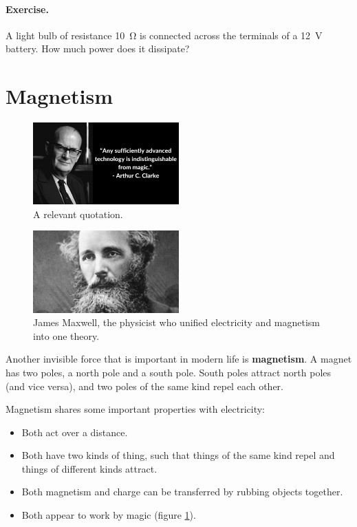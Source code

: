 \documentclass[a4paper]{amsbook}
\newcommand\capcite[1]{}
\begin{document}
\paragraph{Exercise.} A light bulb of resistance \SI{10}{\ohm} is connected across the terminals of a \SI{12}{\volt} battery.
How much power does it dissipate?

\section{Magnetism}
\begin{figure}
  \centering
  \includegraphics[width=0.5\textwidth]{clarke}
  \caption{A relevant quotation. \capcite{http://ludwigiplaw.com/wp-content/uploads/2016/09/arthur_clarke.png}\label{fig:clarke}}
\end{figure}
\begin{figure}
  \centering
  \includegraphics[width=0.5\textwidth]{maxwell}
  \caption{James Maxwell, the physicist who unified electricity and magnetism into one theory. \capcite{https://ichef.bbci.co.uk/images/ic/1920x1080/p039px8r.jpg}\label{fig:maxwell}}
\end{figure}
Another invisible force that is important in modern life is \textbf{magnetism}. A magnet has two poles, a north pole and a
south pole. South poles attract north poles (and vice versa), and two poles of the same kind repel each other.

Magnetism shares some important properties with electricity:
\begin{itemize}
  \item Both act over a distance.
  \item Both have two kinds of thing, such that things of the same kind repel and things of different kinds attract.
  \item Both magnetism and charge can be transferred by rubbing objects together.
  \item Both appear to work by magic (figure \ref{fig:clarke}).
\end{itemize}
\end{document}

